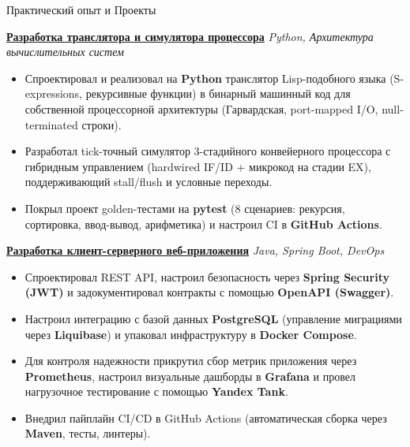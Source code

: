 \documentclass{resume} %
\begin{document}
\begin{rSection}{Практический опыт и Проекты}

\item \textbf{\href{https://github.com/Antichnoste/pipelined-lisp-cpu}{Разработка транслятора и симулятора процессора}} \hfill \textit{Python, Архитектура вычислительных систем}
\begin{itemize}
    \itemsep -3pt {}
    \item Спроектировал и реализовал на \textbf{Python} транслятор Lisp-подобного языка (S-expressions, рекурсивные функции) в бинарный машинный код для собственной процессорной архитектуры (Гарвардская, port-mapped I/O, null-terminated строки).
    \item Разработал tick-точный симулятор 3-стадийного конвейерного процессора с гибридным управлением (hardwired IF/ID + микрокод на стадии EX), поддерживающий stall/flush и условные переходы.
    \item Покрыл проект golden-тестами на \textbf{pytest} (8 сценариев: рекурсия, сортировка, ввод-вывод, арифметика) и настроил CI в \textbf{GitHub Actions}.
\end{itemize}

\item \textbf{\href{https://github.com/Antichnoste/observable-spatial-api}{Разработка клиент-серверного веб-приложения}} \hfill \textit{Java, Spring Boot, DevOps}
\begin{itemize}
    \itemsep -3pt {}
    \item Спроектировал REST API, настроил безопасность через \textbf{Spring Security (JWT)} и задокументировал контракты с помощью \textbf{OpenAPI (Swagger)}.
    \item Настроил интеграцию с базой данных \textbf{PostgreSQL} (управление миграциями через \textbf{Liquibase}) и упаковал инфраструктуру в \textbf{Docker Compose}.
    \item Для контроля надежности прикрутил сбор метрик приложения через \textbf{Prometheus}, настроил визуальные дашборды в \textbf{Grafana} и провел нагрузочное тестирование с помощью \textbf{Yandex Tank}.
    \item Внедрил пайплайн CI/CD в GitHub Actions (автоматическая сборка через \textbf{Maven}, тесты, линтеры).
\end{itemize}

\end{rSection} 
\end{document}
